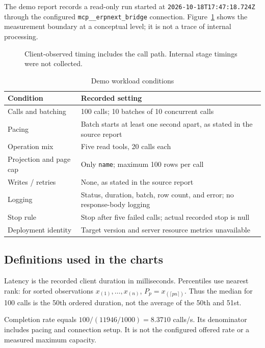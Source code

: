 The demo report records a read-only run started at \texttt{2026-10-18T17:47:18.724Z} through the configured \texttt{mcp\_\_erpnext\_bridge} connection. Figure~\ref{fig:workload} shows the measurement boundary at a conceptual level; it is not a trace of internal processing.

\begin{figure}[h]\centering\caption{Client-observed timing includes the call path. Internal stage timings were not collected.}\label{fig:workload}\end{figure}

\begin{table}[h]\caption{Demo workload conditions}\EvidenceTableStart
\begin{tabularx}{\linewidth}{@{}P{41mm}X@{}}\toprule
Condition & Recorded setting\\\midrule
Calls and batching & 100 calls; 10 batches of 10 concurrent calls\\
Pacing & Batch starts at least one second apart, as stated in the source report\\
Operation mix & Five read tools, 20 calls each\\
Projection and page cap & Only \texttt{name}; maximum 100 rows per call\\
Writes / retries & None, as stated in the source report\\
Logging & Status, duration, batch, row count, and error; no response-body logging\\
Stop rule & Stop after five failed calls; actual recorded stop is null\\
Deployment identity & Target version and server resource metrics unavailable\\\bottomrule
\end{tabularx}\end{table}

\subsection*{Definitions used in the charts}
Latency is the recorded client duration in milliseconds. Percentiles use nearest rank: for sorted observations $x_{(1)},\ldots,x_{(n)}$, $P_p=x_{(\lceil pn\rceil)}$. Thus the median for 100 calls is the 50th ordered duration, not the average of the 50th and 51st.

Completion rate equals $100/(11946/1000)=8.3710$ calls/s. Its denominator includes pacing and connection setup. It is not the configured offered rate or a measured maximum capacity.

